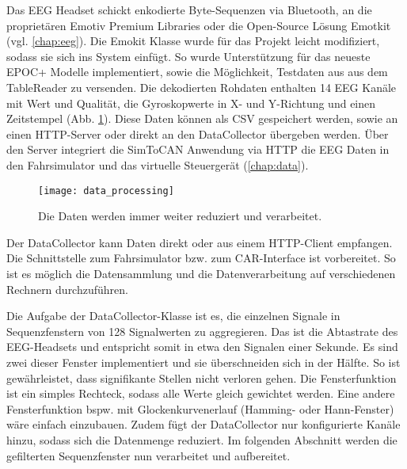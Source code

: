 \label{sec:fetching}
 
Das EEG Headset schickt enkodierte Byte-Sequenzen via Bluetooth, an die proprietären Emotiv Premium Libraries oder die Open-Source Lösung Emotkit (vgl. \ref{chap:eeg}). Die Emokit Klasse wurde für das Projekt leicht modifiziert, sodass sie sich ins System einfügt. So wurde Unterstützung für das neueste EPOC+ Modelle implementiert, sowie die Möglichkeit, Testdaten  aus aus dem TableReader zu versenden. 
Die dekodierten Rohdaten enthalten 14 EEG Kanäle mit Wert und Qualität, die Gyroskopwerte in X- und Y-Richtung und einen Zeitstempel (Abb. \ref{fig:data_processing}). Diese Daten können als CSV gespeichert werden, sowie an einen HTTP-Server oder direkt an den DataCollector übergeben werden. Über den Server integriert die SimToCAN Anwendung via HTTP die EEG Daten in den Fahrsimulator und das virtuelle Steuergerät (\ref{chap:data}).

\begin{figure}[h] 
  \begin{center}
    \texttt{[image: data\_processing]}
    \caption[Datenverarbeitung]{Die Daten werden immer weiter reduziert und verarbeitet. \label{fig:data_processing}}
  \end{center}
\end{figure}

Der DataCollector kann Daten direkt oder aus einem HTTP-Client empfangen. Die Schnittstelle zum Fahrsimulator bzw. zum CAR-Interface ist vorbereitet. So ist es möglich die Datensammlung und die Datenverarbeitung auf verschiedenen Rechnern durchzuführen.

Die Aufgabe der DataCollector-Klasse ist es, die einzelnen Signale in Sequenzfenstern von 128 Signalwerten zu aggregieren. Das ist die Abtastrate des EEG-Headsets und entspricht somit in etwa den Signalen einer Sekunde. Es sind zwei dieser Fenster implementiert und sie überschneiden sich in der Hälfte. So ist gewährleistet, dass signifikante Stellen nicht verloren gehen. Die Fensterfunktion ist ein simples Rechteck, sodass alle Werte gleich gewichtet werden. Eine andere Fensterfunktion bspw. mit Glockenkurvenerlauf (Hamming- oder Hann-Fenster) wäre einfach einzubauen. Zudem fügt der DataCollector nur konfigurierte Kanäle hinzu, sodass sich die Datenmenge reduziert. Im folgenden Abschnitt werden die gefilterten Sequenzfenster nun verarbeitet und aufbereitet.
